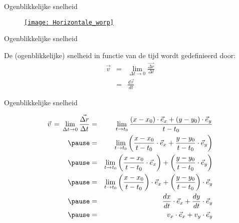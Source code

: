 


\begin{frame}{Ogenblikkelijke snelheid}
\begin{figure}
\href{run:./media/Horizontale_worp_num.gif}{%
\texttt{[image: Horizontale\_worp]}
}
\end{figure}
\end{frame}




\begin{frame}{Ogenblikkelijke snelheid}
\begin{block}{}
De (ogenblikkelijke) snelheid in functie van de tijd wordt gedefinieerd door:
\begin{eqnarray*}
	\vec{v}&=&\lim_{\Delta t\to0}\frac{\vec{\Delta r}}{\Delta t}\\
	&=&\frac{d\vec{r}}{dt}
\end{eqnarray*}
\end{block}
\end{frame}


\begin{frame}{Ogenblikkelijke snelheid}

\begin{eqnarray*}
	\vec{v}\,=\,\lim_{\Delta t\to0}\frac{\vec{\Delta r}}{\Delta t}
	&=&\lim_{t\to t_0}\frac{(x-x_0)\cdot\vec{e}_x+(y-y_0)\cdot\vec{e}_y}{t-t_0}\\
	\pause
	&=&\lim_{t\to t_0}\left(\frac{x-x_0}{t-t_0}\cdot\vec{e}_x+\frac{y-y_0}{t-t_0}\cdot\vec{e}_y\right)\\
	\pause
	&=&\lim_{t\to t_0}\left(\frac{x-x_0}{t-t_0}\cdot\vec{e}_x\right)+\left(\frac{y-y_0}{t-t_0}\cdot\vec{e}_y\right)\\
	\pause
	&=&\lim_{t\to t_0}\left(\frac{x-x_0}{t-t_0}\right)\cdot\vec{e}_x+\left(\frac{y-y_0}{t-t_0}\right)\cdot\vec{e}_y\\
	\pause
	&=&\frac{dx}{dt}\cdot\vec{e}_x+\frac{dy}{dt}\cdot\vec{e}_y\\
	\pause
	&=&v_x\cdot\vec{e}_x+v_y\cdot\vec{e}_y
\end{eqnarray*}
\end{frame}




